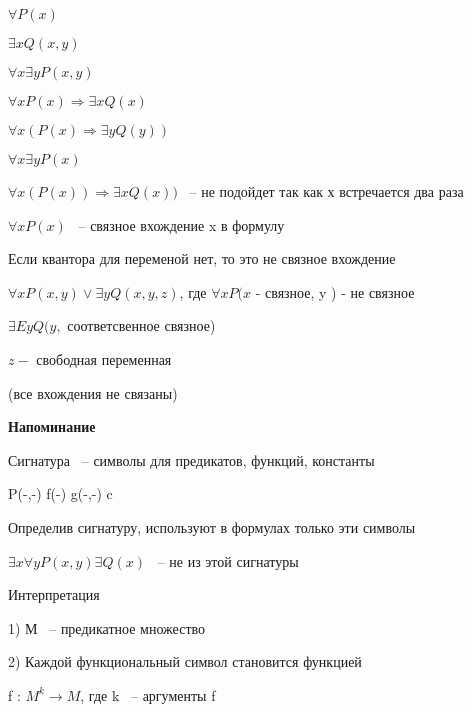 \documentclass[russian]{lecture-notes}
\begin{document}
    \begin{example}

        $\forall P(x)$

        $\exists x Q(x,y)$

        $\forall x \exists y P(x,y)$

        $\forall x P(x) \Rightarrow \exists x Q(x)$

        $\forall x (P(x) \Rightarrow \exists y Q(y))$

        $\forall x \exists y P(x)$

        $\forall x (P(x)) \Rightarrow \exists x Q(x))$ ~-- не подойдет так как х встречается два раза

        \end{example}

    \begin{definition}

        $\forall x P(x)$ ~-- связное вхождение x в формулу

        \end{definition}

    Если квантора для переменой нет, то это не связное вхождение

    $\forall x P(x,y) \lor \exists y Q(x,y,z)$, где $\forall x P(x $ - связное, y ) - не связное

    $\exists E y Q(y,$ соответсвенное связное)

    $z - $ свободная переменная

    (все вхождения не связаны)

    \textbf{Напоминание}

    Сигнатура ~-- символы для предикатов, функций, константы

    \begin{example}

        P(-,-) f(-) g(-,-) c

        \end{example}

    Определив сигнатуру, используют в формулах только эти символы

    $\exists x \forall y P(x,y) \exists Q(x)$ ~-- не из этой сигнатуры

    \begin{definition}

        Интерпретация

        1) М ~-- предикатное множество

        2) Каждой функциональный символ становится функцией

        f : $M^{k} \rightarrow M$, где k ~-- аргументы f

        \end{definition}
\end{document}
